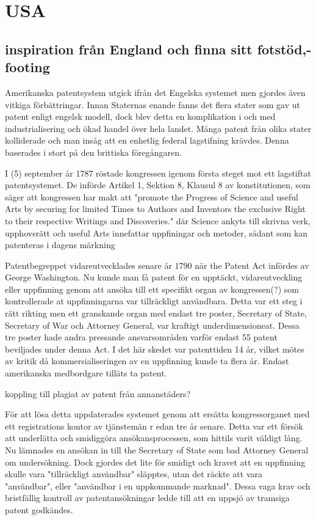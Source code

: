 \section{USA} %
\label{sec:usa}

\subsection{inspiration från England och finna sitt fotstöd,- footing} %
\label{sub:inspiration_från_england}

Amerikanska patentsystem utgick ifrån det Engelska systemet men gjordes även vitkiga förbättringar. Innan Staternas enande fanns det flera stater som gav ut patent enligt engelsk modell, dock blev detta en komplikation i och med industrialisering och ökad handel över hela landet. Många patent från olika stater kolliderade och man insåg att en enhetlig federal lagstifning krävdes. Denna baserades i stort på den brittiska föregångaren.

I (5) september år 1787 röstade kongressen igenom första steget mot ett lagstiftat patentsystemet. De införde Artikel 1, Sektion 8, Klausul 8 av konstitutionen, som säger att kongressen har makt att "promote the Progress of Science and useful Arts by securing for limited Times to Authors and Inventors the exclusive Right to their respective Writings and Discoveries." där Science ankyts till skrivna verk, upphovsrätt och useful Arts innefattar uppfiningar och metoder, sådant som kan patenteras i dagens märkning

Patentbegreppet vidareutvecklades senare år 1790 när the Patent Act infördes av George Washington. Nu kunde man få patent för en upptäckt, vidareutveckling eller uppfinning genom att ansöka till ett specifikt organ av kongressen(?) som kontrollerade at uppfinningarna var tillräckligt användbara. Detta var ett steg i rätt rikting men ett granskande organ med endast tre poster, Secretary of State, Secretary of War och Attorney General, var kraftigt underdimensioneat. Dessa tre poster hade andra pressande ansvarsområden varför endast 55 patent beviljades under denna Act. I det här skedet var patenttiden 14 år, vilket mötes av kritik då kommersialiseringen av en uppfinning kunde ta flera år. Endast amerikanska medbordgare tilläts ta patent.

koppling till plagiat av patent från annanstäders?

För att lösa detta uppdaterades systemet genom att ersätta kongressorganet med ett registrations kontor av tjänstemän r edan tre år senare. Detta var ett försök att underlätta och smidiggöra ansökansprocessen, som hittils varit väldigt lång. Nu lämnades en ansökan in till the Secretary of State som bad Attorney General om undersökning. Dock gjordes det lite för smidigt och kravet att en uppfinning skulle vara "tillräckligt användbar" släpptes, utan det räckte att vara "användbar", eller "användbar i en uppkommande marknad". Dessa vaga krav och bristfällig kontroll av patentansökningar ledde till att en uppsjö av tramsiga patent godkändes. 

